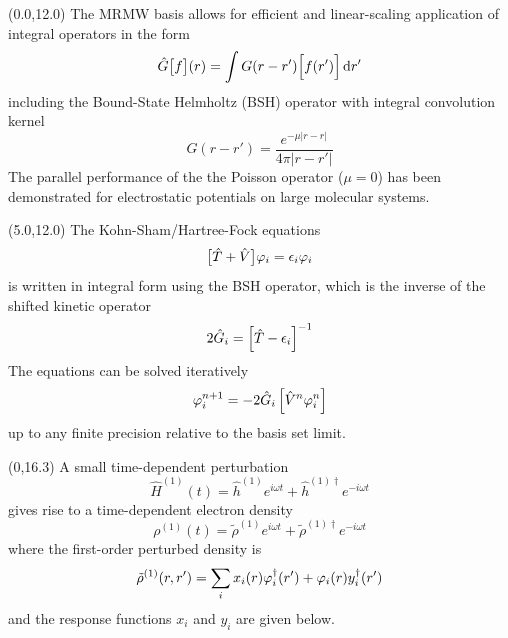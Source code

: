 \documentclass[a0,portrait]{a0poster}
\begin{document}
\begin{textblock}{4.3}(0.0,12.0)
The MRMW basis allows for efficient and linear-scaling application of integral
operators in the form
\begin{equation}
    \hat{G}\big[f\big](r) = \int G(r-r')\Big[f(r')\Big]\,\mathrm{d} r'
\end{equation}
including the Bound-State Helmholtz (BSH) operator with integral convolution 
kernel
\begin{equation}
    G(r-r') = \frac{e^{-\mu|r-r|}}{4\pi|r-r'|}
\end{equation}
The parallel performance of the the Poisson operator 
($\mu = 0$) has been demonstrated for electrostatic potentials on large 
molecular systems\cite{Jensen}. 
\end{textblock}

\begin{textblock}{4.3}(5.0,12.0)
The Kohn-Sham/Hartree-Fock equations 
\begin{equation}
    \big[\hat{T} + \hat{V}\big]\varphi_i = \epsilon_i\varphi_i
\end{equation}
is written in integral form using the BSH operator, 
which is the inverse of the shifted kinetic operator
\begin{equation}
    2\hat{G}_i   = \Big[\hat{T}-\epsilon_i\Big]^{-1}
\end{equation}
The equations can be solved iteratively\cite{Harrison}
\begin{equation}
    \label{eq:unperturbed_scf}
    \varphi^{n+1}_i = -2 \hat{G}_i\left[\hat{V}^n\varphi^n_i\right]
\end{equation}
up to any finite precision relative to the basis set limit.
\end{textblock}

\begin{textblock}{4.3}(0,16.3)
A small time-dependent perturbation
\begin{equation}
    \hat{H}^{(1)}(t) = 
    \hat{h}^{(1)}e^{i\omega t} +
    \hat{h}^{(1)\dag}e^{-i\omega t}
\end{equation}
gives rise to a time-dependent electron density
\begin{equation}
    \rho^{(1)}(t) = 
    \tilde{\rho}^{(1)}e^{i\omega t} +
    \tilde{\rho}^{(1)\dag}e^{-i\omega t}
\end{equation}
where the first-order perturbed density is
\begin{equation}
    \tilde{\rho}^{(1)}(r,r') = 
    \sum_i x_i(r)\varphi_i^\dag(r') + \varphi_i(r)y_i^\dag(r')
\end{equation}
and the response functions $x_i$ and $y_i$ are given below.
\end{textblock}
\end{document}
